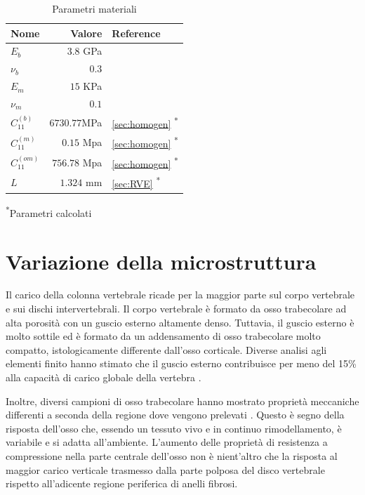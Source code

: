 \documentclass[a4paper,num-refs]{oup-contemporary}
\begin{document}
\begin{table}[bt!]
	\caption{Parametri materiali}\label{tab:example}
	\begin{tabular}{l r l}
		\toprule
		Nome & Valore &  Reference\\
		\midrule
		$E_b$ & $3.8$ GPa & \citet{Cowin1}  \\
		$\nu_b$  & $0.3$ & \citet{Dalstra:93,Wirtz:2000}  \\
		$E_m$  & $15$ KPa  & \citet{Jansen:2015} \\ 
		$\nu_m$ & $0.1 $&    \\
		
		$C_{11}^{(b)}$&$6730.77 $MPa& \cref{sec:homogen} \textsuperscript{*}\\
		$C_{11}^{(m)}$& $0.15$ Mpa& \cref{sec:homogen} \textsuperscript{*}\\
		$C_{11}^{(om)}$& $756.78 $ Mpa & \cref{sec:homogen} \textsuperscript{*}\\
		$L$ & $1.324$ mm& \cref{sec:RVE} \textsuperscript{*}\\
		\bottomrule
	\end{tabular}
	\begin{tablenotes}
		
		\item \textsuperscript{*}Parametri calcolati
	\end{tablenotes}
\end{table}


\section{Variazione della microstruttura}

Il carico della colonna vertebrale ricade per la maggior parte sul corpo vertebrale e sui dischi intervertebrali. Il corpo vertebrale è formato da osso trabecolare ad alta porosità con un guscio esterno altamente denso. Tuttavia, il guscio esterno è molto sottile ed è formato da un addensamento di osso trabecolare molto compatto, istologicamente differente dall'osso corticale. Diverse analisi agli elementi finito hanno stimato che il guscio esterno contribuisce per meno del 15\% alla capacità di carico globale della vertebra \citep{Ferguson:2003, Silva:1997}.

Inoltre, diversi campioni di osso trabecolare hanno mostrato  proprietà meccaniche differenti a seconda della regione dove vengono prelevati \citep{Keller:1989,Keller:1993}. Questo è segno della risposta dell'osso che, essendo un tessuto vivo e in continuo rimodellamento, è variabile e si adatta all'ambiente. L'aumento delle proprietà di resistenza a compressione nella parte centrale dell'osso non è nient'altro che la risposta al maggior carico verticale trasmesso dalla parte polposa del disco vertebrale rispetto all'adicente regione periferica di anelli fibrosi. 
\end{document}
